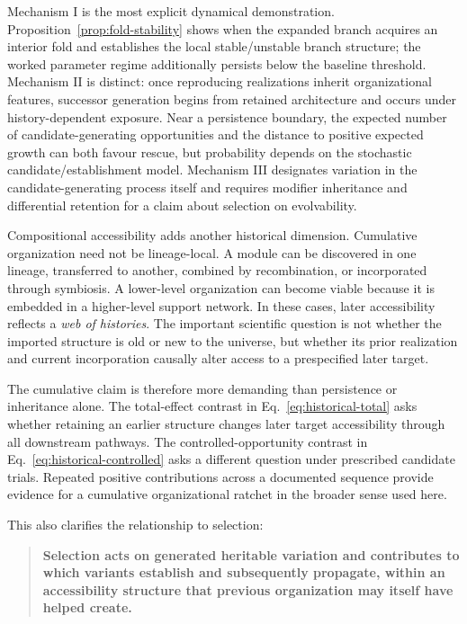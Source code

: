\documentclass[11pt,a4paper]{article}
\begin{document}
Mechanism I is the most explicit dynamical demonstration. Proposition~\ref{prop:fold-stability} shows when the expanded branch acquires an interior fold and establishes the local stable/unstable branch structure; the worked parameter regime additionally persists below the baseline threshold. Mechanism II is distinct: once reproducing realizations inherit organizational features, successor generation begins from retained architecture and occurs under history-dependent exposure. Near a persistence boundary, the expected number of candidate-generating opportunities and the distance to positive expected growth can both favour rescue, but probability depends on the stochastic candidate/establishment model. Mechanism III designates variation in the candidate-generating process itself and requires modifier inheritance and differential retention for a claim about selection on evolvability.

Compositional accessibility adds another historical dimension. Cumulative organization need not be lineage-local. A module can be discovered in one lineage, transferred to another, combined by recombination, or incorporated through symbiosis. A lower-level organization can become viable because it is embedded in a higher-level support network. In these cases, later accessibility reflects a \emph{web of histories}. The important scientific question is not whether the imported structure is old or new to the universe, but whether its prior realization and current incorporation causally alter access to a prespecified later target.

The cumulative claim is therefore more demanding than persistence or inheritance alone. The total-effect contrast in Eq.~\eqref{eq:historical-total} asks whether retaining an earlier structure changes later target accessibility through all downstream pathways. The controlled-opportunity contrast in Eq.~\eqref{eq:historical-controlled} asks a different question under prescribed candidate trials. Repeated positive contributions across a documented sequence provide evidence for a cumulative organizational ratchet in the broader sense used here.

This also clarifies the relationship to selection:

\begin{quote}
\textbf{Selection acts on generated heritable variation and contributes to which variants establish and subsequently propagate, within an accessibility structure that previous organization may itself have helped create.}
\end{quote}
\end{document}

